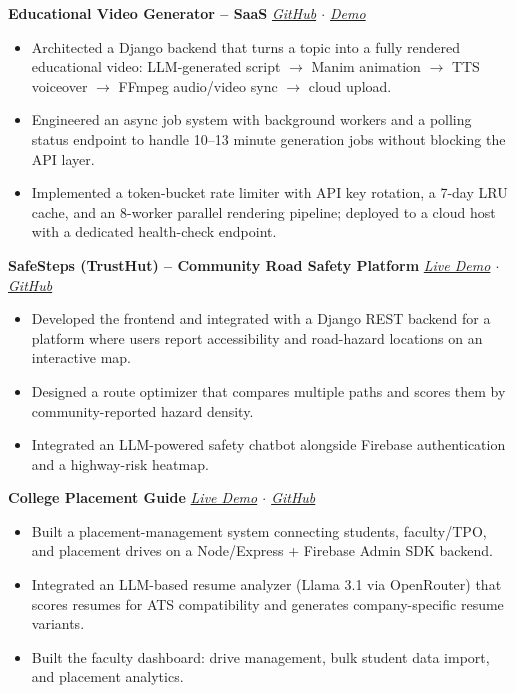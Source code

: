 \documentclass[a4paper,10pt]{article}
\newcommand{\entry}[2]{%
  \noindent\textbf{#1} \hfill \textit{#2}\\[0pt]
}
\begin{document}
\entry{Educational Video Generator -- SaaS \normalfont{(Personal)}}{\href{https://github.com/Saandeep-Sai/VideoGenerator_Backend}{GitHub} $\cdot$ \href{https://www.youtube.com/watch?v=5BQwnrqrVPE}{Demo}}
\begin{itemize}[leftmargin=*, itemsep=1pt, topsep=2pt]
\item Architected a Django backend that turns a topic into a fully rendered educational video: LLM-generated script $\rightarrow$ Manim animation $\rightarrow$ TTS voiceover $\rightarrow$ FFmpeg audio/video sync $\rightarrow$ cloud upload.
\item Engineered an async job system with background workers and a polling status endpoint to handle 10--13 minute generation jobs without blocking the API layer.
\item Implemented a token-bucket rate limiter with API key rotation, a 7-day LRU cache, and an 8-worker parallel rendering pipeline; deployed to a cloud host with a dedicated health-check endpoint.
\end{itemize}

\vspace{2pt}

\entry{SafeSteps (TrustHut) -- Community Road Safety Platform \normalfont{(Client Project)}}{
\href{https://trust-hut.vercel.app/}{Live Demo} $\cdot$
\href{https://github.com/Saandeep-Sai/TrustHut}{GitHub}}
\begin{itemize}[leftmargin=*, itemsep=1pt, topsep=2pt]
\item Developed the frontend and integrated with a Django REST backend for a platform where users report accessibility and road-hazard locations on an interactive map.
\item Designed a route optimizer that compares multiple paths and scores them by community-reported hazard density.
\item Integrated an LLM-powered safety chatbot alongside Firebase authentication and a highway-risk heatmap.
\end{itemize}

\vspace{2pt}

\entry{College Placement Guide }{\href{https://college-placement-guide-a3x4.vercel.app/}{Live Demo} $\cdot$ \href{https://github.com/Saandeep-Sai/College-placement-guide}{GitHub}}
\begin{itemize}[leftmargin=*, itemsep=1pt, topsep=2pt]
\item Built a placement-management system connecting students, faculty/TPO, and placement drives on a Node/Express + Firebase Admin SDK backend.
\item Integrated an LLM-based resume analyzer (Llama 3.1 via OpenRouter) that scores resumes for ATS compatibility and generates company-specific resume variants.
\item Built the faculty dashboard: drive management, bulk student data import, and placement analytics.
\end{itemize}
\end{document}
